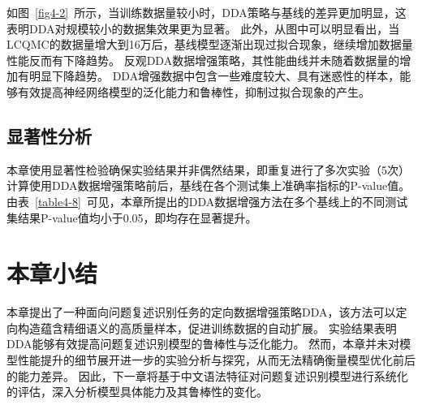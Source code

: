 如图~\ref{fig4-2}~所示，当训练数据量较小时，DDA策略与基线的差异更加明显，这表明DDA对规模较小的数据集效果更为显著。
此外，从图中可以明显看出，当LCQMC的数据量增大到16万后，基线模型逐渐出现过拟合现象，继续增加数据量性能反而有下降趋势。
反观DDA数据增强策略，其性能曲线并未随着数据量的增加有明显下降趋势。
DDA增强数据中包含一些难度较大、具有迷惑性的样本，能够有效提高神经网络模型的泛化能力和鲁棒性，抑制过拟合现象的产生。

\subsection{显著性分析}

本章使用显著性检验确保实验结果并非偶然结果，即重复进行了多次实验（5次）计算使用DDA数据增强策略前后，基线在各个测试集上准确率指标的P-value值。
由表~\ref{table4-8}~可见，本章所提出的DDA数据增强方法在多个基线上的不同测试集结果P-value值均小于0.05，即均存在显著提升。



\section{本章小结}

本章提出了一种面向问题复述识别任务的定向数据增强策略DDA，该方法可以定向构造蕴含精细语义的高质量样本，促进训练数据的自动扩展。
实验结果表明DDA能够有效提高问题复述识别模型的鲁棒性与泛化能力。
然而，本章并未对模型性能提升的细节展开进一步的实验分析与探究，从而无法精确衡量模型优化前后的能力差异。
因此，下一章将基于中文语法特征对问题复述识别模型进行系统化的评估，深入分析模型具体能力及其鲁棒性的变化。
